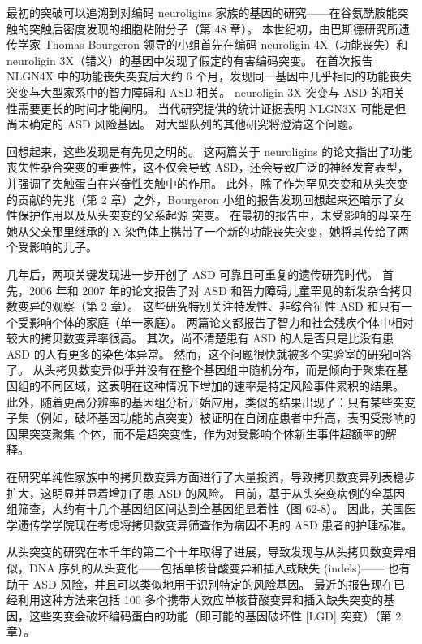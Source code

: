 最初的突破可以追溯到对编码 neuroligins 家族的基因的研究——在谷氨酰胺能突触的突触后密度发现的细胞粘附分子（第 48 章）。 本世纪初，由巴斯德研究所遗传学家 Thomas Bourgeron 领导的小组首先在编码 neuroligin 4X（功能丧失）和 neuroligin 3X（错义）的基因中发现了假定的有害编码突变。 在首次报告 NLGN4X 中的功能丧失突变后大约 6 个月，发现同一基因中几乎相同的功能丧失突变与大型家系中的智力障碍和 ASD 相关。 neuroligin 3X 突变与 ASD 的相关性需要更长的时间才能阐明。 当代研究提供的统计证据表明 NLGN3X 可能是但尚未确定的 ASD 风险基因。 对大型队列的其他研究将澄清这个问题。

回想起来，这些发现是有先见之明的。 这两篇关于 neuroligins 的论文指出了功能丧失性杂合突变的重要性，这不仅会导致 ASD，还会导致广泛的神经发育表型，并强调了突触蛋白在兴奋性突触中的作用。 此外，除了作为罕见突变和从头突变的贡献的先兆（第 2 章）之外，Bourgeron 小组的报告发现回想起来还暗示了女性保护作用以及从头突变的父系起源 突变。 在最初的报告中，未受影响的母亲在她从父亲那里继承的 X 染色体上携带了一个新的功能丧失突变，她将其传给了两个受影响的儿子。

几年后，两项关键发现进一步开创了 ASD 可靠且可重复的遗传研究时代。 首先，2006 年和 2007 年的论文报告了对 ASD 和智力障碍儿童罕见的新发杂合拷贝数变异的观察（第 2 章）。 这些研究特别关注特发性、非综合征性 ASD 和只有一个受影响个体的家庭（单一家庭）。 两篇论文都报告了智力和社会残疾个体中相对较大的拷贝数变异率很高。 其次，尚不清楚患有 ASD 的人是否只是比没有患 ASD 的人有更多的染色体异常。 然而，这个问题很快就被多个实验室的研究回答了。 从头拷贝数变异似乎并没有在整个基因组中随机分布，而是倾向于聚集在基因组的不同区域，这表明在这种情况下增加的速率是特定风险事件累积的结果。 此外，随着更高分辨率的基因组分析开始应用，类似的结果出现了：只有某些突变子集（例如，破坏基因功能的点突变）被证明在自闭症患者中升高，表明受影响的因果突变聚集 个体，而不是超突变性，作为对受影响个体新生事件超额率的解释。

在研究单纯性家族中的拷贝数变异方面进行了大量投资，导致拷贝数变异列表稳步扩大，这明显并显着增加了患 ASD 的风险。 目前，基于从头突变病例的全基因组筛查，大约有十几个基因组区间达到全基因组显着性（图 62-8）。 因此，美国医学遗传学学院现在考虑将拷贝数变异筛查作为病因不明的 ASD 患者的护理标准。

从头突变的研究在本千年的第二个十年取得了进展，导致发现与从头拷贝数变异相似，DNA 序列的从头变化——包括单核苷酸变异和插入或缺失 (indels)—— 也有助于 ASD 风险，并且可以类似地用于识别特定的风险基因。 最近的报告现在已经利用这种方法来包括 100 多个携带大效应单核苷酸变异和插入缺失突变的基因，这些突变会破坏编码蛋白的功能（即可能的基因破坏性 [LGD] 突变）（第 2 章）。


